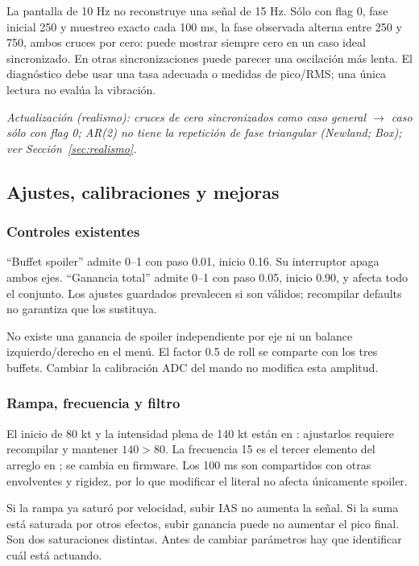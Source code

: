 \documentclass[11pt,a4paper]{article}
\newcommand{\code}[1]{\texttt{\detokenize{#1}}}
\begin{document}
La pantalla de 10 Hz no reconstruye una señal de 15 Hz. Sólo con flag 0, fase inicial 250 y muestreo exacto cada 100 ms, la fase observada alterna entre 250 y 750, ambos cruces por cero: puede mostrar siempre cero en un caso ideal sincronizado. En otras sincronizaciones puede parecer una oscilación más lenta. El diagnóstico debe usar una tasa adecuada o medidas de pico/RMS; una única lectura no evalúa la vibración.

\textit{Actualización (realismo): cruces de cero sincronizados como caso general $\rightarrow$ caso sólo con flag 0; AR(2) no tiene la repetición de fase triangular (Newland; Box); ver Sección~\ref{sec:realismo}.}

\subsection{Ajustes, calibraciones y mejoras}
\subsubsection{Controles existentes}
``Buffet spoiler'' admite 0--1 con paso 0.01, inicio 0.16. Su interruptor apaga ambos ejes. ``Ganancia total'' admite 0--1 con paso 0.05, inicio 0.90, y afecta todo el conjunto. Los ajustes guardados prevalecen si son válidos; recompilar defaults no garantiza que los sustituya.

No existe una ganancia de spoiler independiente por eje ni un balance izquierdo/derecho en el menú. El factor 0.5 de roll se comparte con los tres buffets. Cambiar la calibración ADC del mando no modifica esta amplitud.

\subsubsection{Rampa, frecuencia y filtro}
El inicio de 80 kt y la intensidad plena de 140 kt están en \code{BuffetModel.h}: ajustarlos requiere recompilar y mantener $140>80$. La frecuencia 15 es el tercer elemento del arreglo en \code{SimEffects.h}; se cambia en firmware. Los 100 ms son compartidos con otras envolventes y rigidez, por lo que modificar el literal no afecta únicamente spoiler.

Si la rampa ya saturó por velocidad, subir IAS no aumenta la señal. Si la suma está saturada por otros efectos, subir ganancia puede no aumentar el pico final. Son dos saturaciones distintas. Antes de cambiar parámetros hay que identificar cuál está actuando.
\end{document}
